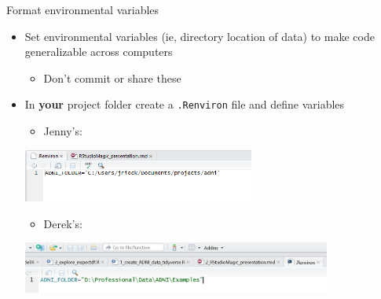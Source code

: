 \documentclass[
  ignorenonframetext,
]{beamer}
\providecommand{\tightlist}{%
  \setlength{\itemsep}{0pt}\setlength{\parskip}{0pt}}
\begin{document}
\begin{frame}[fragile]{Format environmental variables}
\protect\hypertarget{format-environmental-variables}{}

\begin{itemize}
\tightlist
\item
  Set environmental variables (ie, directory location of data) to make
  code generalizable across computers

  \begin{itemize}
  \tightlist
  \item
    Don't commit or share these
  \end{itemize}
\item
  In \textbf{your} project folder create a \texttt{.Renviron} file and
  define variables

  \begin{itemize}
  \tightlist
  \item
    Jenny's:
  \end{itemize}

  \includegraphics[width=0.6\textwidth,height=\textheight]{../external/images/setup_3_rstudio_project_environ.PNG}

  \begin{itemize}
  \tightlist
  \item
    Derek's:
  \end{itemize}

  \includegraphics[width=0.8\textwidth,height=\textheight]{../external/images/setup_3_rstudio_project_environ2.PNG}
\end{itemize}

\end{frame}
\end{document}
